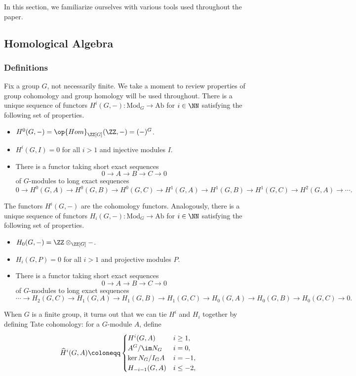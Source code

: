 
In this section, we familiarize ourselves with various tools used throughout the paper.

\subsection{Homological Algebra}

\subsubsection{Definitions}
Fix a group $G$, not necessarily finite. We take a moment to review properties of group cohomology and group homology will be used throughout. There is a unique sequence of functors $H^i(G,-)\colon\mathrm{Mod}_G\to\mathrm{Ab}$ for $i\in\NN$ satisfying the following set of properties.
\begin{itemize}
	\item $H^0(G,-)=\op{Hom}_{\ZZ[G]}(\ZZ,-)=(-)^G$.
	\item $H^i(G,I)=0$ for all $i>1$ and injective modules $I$.
	\item There is a functor taking short exact sequences
	\[0\to A\to B\to C\to 0\]
	of $G$-modules to long exact sequences
	\[0\to H^0(G,A)\to H^0(G,B)\to H^0(G,C)\to H^1(G,A)\to H^1(G,B)\to H^1(G,C)\to H^2(G,A)\to\cdots.\]
\end{itemize}
The functors $H^i(G,-)$ are the cohomology functors. Analogously, there is a unique sequence of functors $H_i(G,-)\colon\mathrm{Mod}_G\to\mathrm{Ab}$ for $i\in\NN$ satisfying the following set of properties.
\begin{itemize}
	\item $H_0(G,-)=\ZZ\otimes_{\ZZ[G]}-$.
	\item $H_i(G,P)=0$ for all $i>1$ and projective modules $P$.
	\item There is a functor taking short exact sequences
	\[0\to A\to B\to C\to 0\]
	of $G$-modules to long exact sequences
	\[\cdots\to H_2(G,C)\to H_1(G,A)\to H_1(G,B)\to H_1(G,C)\to H_0(G,A)\to H_0(G,B)\to H_0(G,C)\to0.\]
\end{itemize}
When $G$ is a finite group, it turns out that we can tie $H^i$ and $H_i$ together by defining Tate cohomology: for a $G$-module $A$, define
\[\widehat H^i(G,A)\coloneqq\begin{cases}
	H^i(G,A) & i\ge1, \\
	A^G/\im N_G & i=0, \\
	\ker N_G/I_GA & i=-1, \\
	H_{-i-1}(G,A) & i\le-2,
\end{cases}\]
